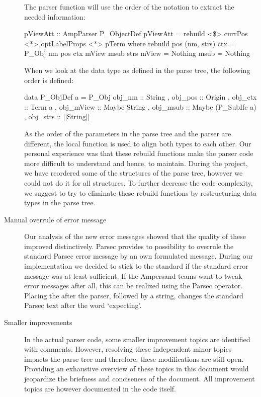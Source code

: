 \begin{description}
   The parser function will use the order of the notation to extract the needed information:
%
   \begin{haskell}
    pViewAtt :: AmpParser P_ObjectDef
    pViewAtt = rebuild <\$> currPos <*> optLabelProps <*> pTerm
        where rebuild pos (nm, strs) ctx =
          P_Obj nm pos ctx mView msub strs
          mView = Nothing
          msub  = Nothing
   \end{haskell}
   When we look at the data type as defined in the parse tree, the following order is defined:
   \begin{haskell}
   data P_ObjDef a =
      P_Obj { obj_nm :: String          
            , obj_pos :: Origin  
            , obj_ctx :: Term a
            , obj_mView :: Maybe String 
            , obj_msub :: Maybe (P_SubIfc a)  
            , obj_strs :: [[String]]
            }
    \end{haskell}
    As the order of the parameters in the parse tree and the parser are different, the local function  is used to align both types to each other.
   Our personal experience was that these rebuild functions make the parser code more difficult to understand and hence, to maintain.
  During the project, we have reordered some of the structures of the parse tree, however we could not do it for all structures.
   To further decrease the code complexity, we suggest to try to eliminate these rebuild functions by restructuring data types in the parse tree.

  \item[Manual overrule of error message]
    Our analysis of the new error messages showed that the quality of these improved distinctively.
    Parsec provides to possibility to overrule the standard Parsec error message by an own formulated message.
    During our implementation we decided to stick to the standard if the standard error message was at least sufficient.
    If the Ampersand teams want to tweak error messages after all, this can be realized using the  Parsec operator.
    Placing the  after the parser, followed by a string, changes the standard Parsec text after the word `expecting'.

  \item [Smaller improvements]
    In the actual parser code, some smaller improvement topics are identified with comments.
    However, resolving these independent minor topics impacts the parse tree and therefore, these modifications are still open.
    Providing an exhaustive overview of these topics in this document would jeopardize the briefness and conciseness of the document.
    All improvement topics are however documented in the code itself. 
\end{description}
